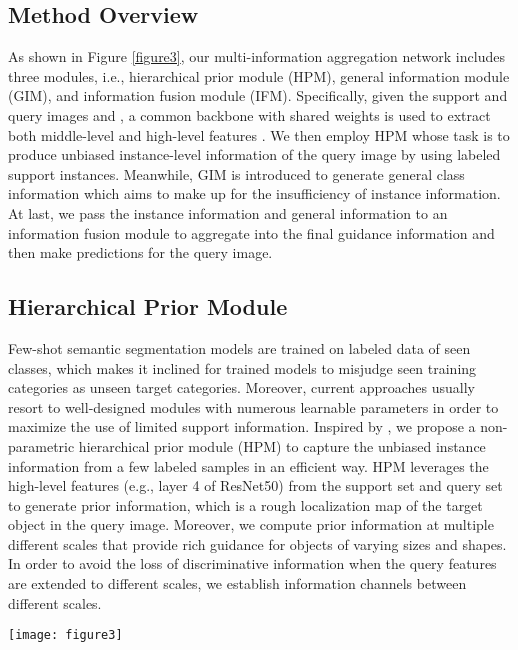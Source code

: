 \documentclass[10pt,twocolumn,letterpaper]{article}
\begin{document}
\subsection{Method Overview}
As shown in Figure \ref{figure3}, our multi-information aggregation network includes three modules, i.e., hierarchical prior module (HPM), general information module (GIM), and information fusion module (IFM). Specifically, given the support and query images  and , a common backbone with shared weights is used to extract both middle-level \cite{canet} and high-level features \cite{pfenet}. We then employ HPM whose task is to produce unbiased instance-level information  of the query image by using labeled support instances. Meanwhile, GIM is introduced to generate general class information which aims to make up for the insufficiency of instance information. At last, we pass the instance information and general information to an information fusion module to aggregate into the final guidance information and then make predictions for the query image.

\subsection{Hierarchical Prior Module}
Few-shot semantic segmentation models are trained on labeled data of seen classes, which makes it inclined for trained models to misjudge seen training categories as unseen target categories. Moreover, current approaches usually resort to well-designed modules with numerous learnable parameters in order to maximize the use of limited support information. Inspired by \cite{pfenet}, we propose a non-parametric hierarchical prior module (HPM) to capture the unbiased instance information from a few labeled samples in an efficient way. HPM leverages the high-level features (e.g., layer 4 of ResNet50) from the support set and query set to generate prior information, which is a rough localization map of the target object in the query image. Moreover, we compute prior information at multiple different scales that provide rich guidance for objects of varying sizes and shapes. In order to avoid the loss of discriminative information when the query features are extended to different scales, we establish information channels between different scales.\par

\begin{figure*}[htbp]
	\centering
	\texttt{[image: figure3]}
	\caption{The overall architecture of our proposed multi-information aggregation network.}
	\label{figure3}
\end{figure*}
\end{document}
